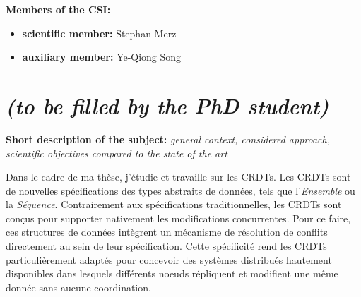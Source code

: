 \documentclass[12pt]{article}
\newcommand{\commentaire}[1]{\small\textit{#1}}
\begin{document}
\noindent\textbf{Members of the CSI:}
\begin{itemize}
\item\textbf{scientific member:}
  Stephan Merz
\item\textbf{auxiliary member:}
  Ye-Qiong Song
\end{itemize}

\newpage
\section*{ \textit{\small (to be filled by the PhD student)}}

\noindent\textbf{Short description of the subject:}
\commentaire{%
  general context, considered approach, scientific objectives
  compared to the state of the art\\}

Dans le cadre de ma thèse, j'étudie et travaille sur les \acfp{CRDT}.
Les \acp{CRDT} sont de nouvelles spécifications des types abstraits de données, tels que l'\emph{Ensemble} ou la \emph{Séquence}.
Contrairement aux spécifications traditionnelles, les \acp{CRDT} sont conçus pour supporter nativement les modifications concurrentes.
Pour ce faire, ces structures de données intègrent un mécanisme de résolution de conflits directement au sein de leur spécification.
Cette spécificité rend les \acp{CRDT} particulièrement adaptés pour concevoir des systèmes distribués hautement disponibles dans lesquels différents noeuds répliquent et modifient une même donnée sans aucune coordination.
\\
\end{document}

